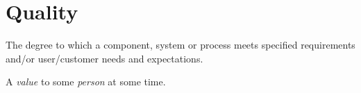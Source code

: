 \section{Quality}
\label{sec:Quality}

The degree to which a component, system or process meets specified requirements and/or user/customer needs and expectations.

A \textit{value} to some \textit{person} at some time.
